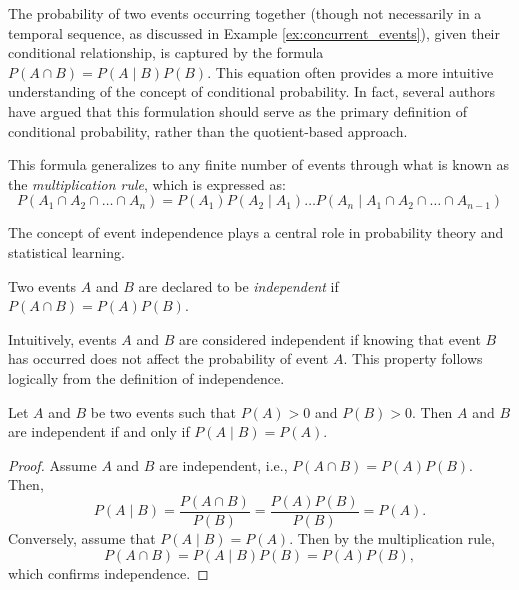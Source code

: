 The probability of two events occurring together (though not necessarily in a temporal sequence, as discussed in Example \ref{ex:concurrent_events}), given their conditional relationship, is captured by the formula $P \left( A \cap B \right) = P \left( A \mid B \right) P \left( B \right)$. This equation often provides a more intuitive understanding of the concept of conditional probability. In fact, several authors have argued that this formulation should serve as the primary definition of conditional probability, rather than the quotient-based approach.

This formula generalizes to any finite number of events through what is known as the \emph{multiplication rule}, which is expressed as:
\begin{equation}\label{eq:multiplication_rule}
P \left( A_{1} \cap A_{2} \cap \ldots \cap A_{n} \right) = P \left( A_{1} \right) P \left( A_{2} \mid A_{1}\right) \ldots  P \left( A_{n} \mid A_{1}\cap A_{2} \cap \ldots \cap A_{n-1} \right)
\end{equation}

The concept of event independence plays a central role in probability theory and statistical learning.

\begin{definition}\label{independent_events}
Two events $A$ and $B$ are declared to be \emph{independent} if $P \left( A \cap B \right) = P \left( A \right) P \left(B \right)$.
\end{definition}

Intuitively, events $A$ and $B$ are considered independent if knowing that event $B$ has occurred does not affect the probability of event $A$. This property follows logically from the definition of independence.

\begin{proposition}
Let $A$ and $B$ be two events such that $P \left( A \right) > 0$ and $P \left( B \right) > 0$. Then $A$ and $B$ are independent if and only if $P \left( A \mid B \right) = P \left( A \right)$.
\end{proposition}
\begin{proof}
Assume $A$ and $B$ are independent, i.e., $P \left( A \cap B \right) = P \left( A \right) P \left( B \right)$. Then,
\[
P \left( A \mid B \right) = \frac{P \left( A \cap B \right)}{P \left( B \right)} = \frac{P \left( A \right) P \left( B \right)}{P \left( B \right)} = P \left( A \right).
\]
Conversely, assume that $P \left( A \mid B \right) = P \left( A \right)$. Then by the multiplication rule,
\[
P \left( A \cap B \right) = P \left( A \mid B \right) P \left( B \right) = P \left( A \right) P \left( B \right),
\]
which confirms independence.
\end{proof}

